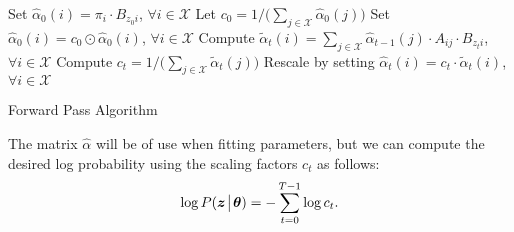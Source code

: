 \begin{algorithm}
\begin{algorithmic}[1]
        \State \textrm{Set $\widehat{\alpha}_0(i) = \pi_i\cdot B_{z_0i}$, $\forall i \in \mathscr{X}$}
        \State \textrm{Let $c_0= 1/ \big( \sum_{j \in \mathscr{X}}\widehat{\alpha}_0(j) \big)$}
        \State \textrm{Set $\widehat{\alpha}_0(i) = c_0 \odot \widehat{\alpha}_0(i)$, $\forall i \in \mathscr{X}$}
    \EndFor
        \State \textrm{Compute $\tilde{\alpha}_t(i) = \sum_{j \in \mathscr{X}}\widehat{\alpha}_{t-1}(j)\cdot A_{ij}\cdot B_{z_ti}$, $\forall i \in \mathscr{X}$}
        \State \textrm{Compute $c_t = 1/\big(\sum_{j \in \mathscr{X}} \tilde{\alpha}_t(j) \big)$}
        \State \textrm{Rescale by setting $\widehat{\alpha}_t(i) = c_t \cdot \tilde{\alpha}_t(i)$, $\forall i \in \mathscr{X}$}
    \EndFor
\EndProcedure
\end{algorithmic}
\caption{Forward Pass Algorithm}
\label{alg:hmm1}
\end{algorithm}

The matrix $\widehat{\alpha}$ will be of use when fitting parameters, but we can compute the desired log probability using the scaling factors $c_t$ as follows:
\[
\log P(\boldsymbol z \!\mathrel{\big|}\! \boldsymbol\theta) = -\sum_{t=0}^{T-1} \log c_t.
\]

